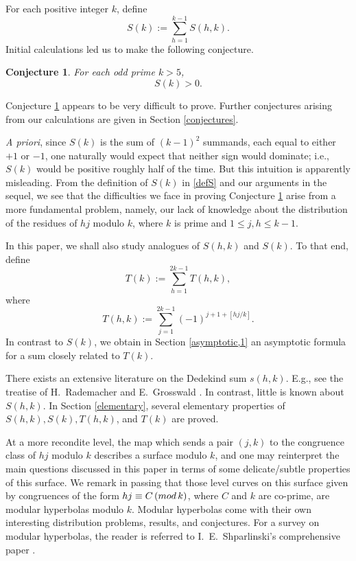 \documentclass[11pt,reqno]{amsart}
\renewcommand{\pmod}[1]{\,(\textup{mod}\,#1)}
\theoremstyle{plain}
\numberwithin{equation}{section}
\newtheorem{conjecture}[theorem]{Conjecture}
\begin{document}
For each positive integer $k$, define
\begin{equation}\label{defS}
S(k) := \sum_{h=1}^{k-1}S(h,k).
\end{equation}
Initial calculations led us to make the following conjecture.
\begin{conjecture}\label{mainconjecture} For each odd prime $k>5$,
\begin{equation*}
S(k)>0.
\end{equation*}
\end{conjecture}

Conjecture \ref{mainconjecture} appears to be very difficult to prove.
Further conjectures arising from our calculations are given in Section \ref{conjectures}.


\emph{A priori}, since $S(k)$ is the sum of $(k-1)^2$  summands, each equal to either $+1$ or $-1$, one naturally would expect that neither sign would dominate; i.e., $S(k)$ would be positive roughly half of the time.  But this intuition is apparently misleading.  From the definition of $S(k)$ in \eqref{defS} and our arguments  in the sequel,
we see that the difficulties we face in proving Conjecture \ref{mainconjecture} arise from a more fundamental problem, namely, our lack of knowledge about the distribution of the residues of $hj$ modulo $k$, where $k$ is prime and $1\leq j,h \leq k-1$.

In this paper, we shall also study analogues of $S(h,k)$ and $S(k)$.
To that end,  define
\begin{equation}\label{defT}
T(k) := \sum_{h=1}^{2k-1}T(h,k),
\end{equation}
where
\begin{equation}\label{1.1T}
T(h,k) := \sum_{j=1}^{2k-1}(-1)^{j+1+[hj/k]}.
\end{equation}
In contrast to $S(k)$, we obtain in Section \ref{asymptotic,1} an asymptotic formula for a sum closely related to $T(k)$.

There exists an extensive literature on the Dedekind sum $s(h,k)$. E.g., see the treatise of H.~Rademacher and E.~Grosswald \cite{rg}.  In contrast, little is known about $S(h,k)$. In Section \ref{elementary}, several elementary properties of $S(h,k), S(k), T(h,k)$, and $T(k)$ are proved.

At a more recondite level, the map which sends a pair $(j,k)$ to the congruence class of $hj$ modulo $k$
describes a surface modulo $k$, and one may reinterpret the main questions
discussed in this paper in terms of some delicate/subtle properties of this surface. We
remark in passing that those level curves on this surface given by congruences of the form $hj\equiv C \pmod{k}$,
where $C$ and $k$ are co-prime, are modular hyperbolas modulo $k$. Modular
hyperbolas come with their own interesting distribution problems, results, and conjectures. For a survey on modular
hyperbolas, the reader is referred to I.~E.~Shparlinski's comprehensive paper \cite{shparlinski}.
\end{document}
